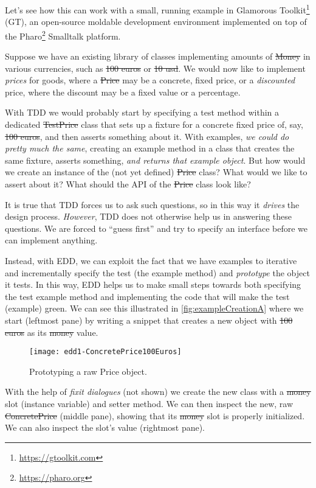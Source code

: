 \documentclass[sigplan,anonymous,review,10pt]{acmart}
\begin{document}
Let's see how this can work with a small, running example in Glamorous Toolkit\footnote{\url{https://gtoolkit.com}} (GT), an open-source moldable development environment implemented on top of the Pharo\footnote{\url{https://pharo.org}} Smalltalk  platform.

Suppose we have an existing library of classes implementing amounts of \st{Money} in various currencies, such as \st{100 euros} or \st{10 usd}.
We would now like to implement \emph{prices} for goods, where a \st{Price} may be a concrete, fixed price, or a \emph{discounted} price, where the discount may be a fixed value or a percentage.

With TDD we would probably start by specifying a test method within a dedicated \st{TestPrice} class that sets up a fixture for a concrete fixed price of, say, \st{100 euros}, and then asserts something about it.
With examples, \emph{we could do pretty much the same}, creating an example method in a  class that creates the same fixture, asserts something, \emph{and returns that example object}.
But how would we create an instance of the (not yet defined) \st{Price} class?
What would we like to assert about it?
What should the API of the \st{Price} class look like?

It is true that TDD forces us to ask such questions, so in this way it \emph{drives} the design process.
\emph{However}, TDD does not otherwise help us in answering these questions.
We are forced to ``guess first'' and try to specify an interface before we can implement anything.

Instead, with EDD, we can exploit the fact that we have examples to iterative and incrementally specify the test (\ie the example method) and \emph{prototype} the object it tests.
In this way, EDD helps us to make small steps towards both specifying the test example method and implementing the code that will make the test (example) green.
We can see this illustrated in \autoref{fig:exampleCreationA} where we start (leftmost pane) by writing a snippet that creates a new  object with \st{100 euros} as its \st{money} value.
\begin{figure}[h]
  \texttt{[image: edd1-ConcretePrice100Euros]}
	\caption{Prototyping a raw Price object.}
  \label{fig:exampleCreationA}
\end{figure}


With the help of \emph{fixit dialogues} (not shown) we create the new class with a \st{money} slot (instance variable) and setter method.
We can then inspect the new, raw \st{ConcretePrice} (middle pane), showing that its \st{money} slot is properly initialized.
We can also inspect the slot's value (rightmost pane).
\end{document}
